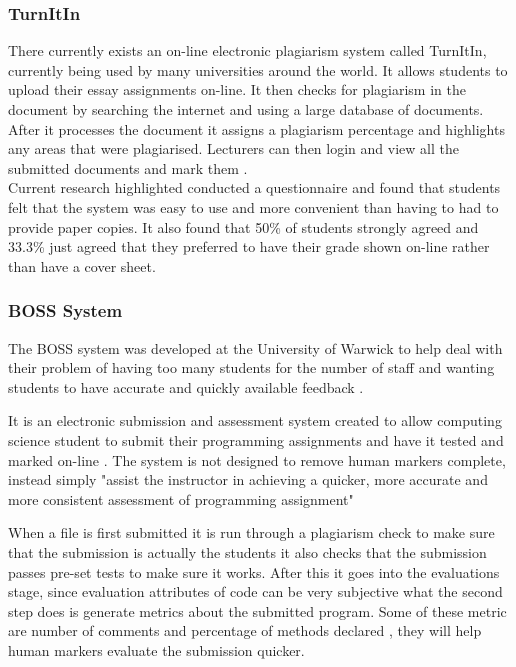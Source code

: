 \documentclass[12pt]{article}  %
\begin{document}
\subsubsection{TurnItIn}
There currently exists an on-line electronic plagiarism system called TurnItIn, \cite{_turnitin_????} currently being used by many universities around the world. It allows students to upload their essay assignments on-line. It then checks for plagiarism in the document by searching the internet and using a large database of documents. After it processes the document it assigns a plagiarism percentage and highlights any areas that were plagiarised. Lecturers can then login and view all the submitted documents and mark them .\\
Current research highlighted \cite{dahl_turnitin_2007} conducted a questionnaire and found that students felt that the system was easy to use and more convenient than having to had to provide paper copies. It also found that 50\% of students strongly agreed and 33.3\% just agreed that they preferred to have their grade shown on-line rather than have a cover sheet.

\subsubsection{BOSS System}
The BOSS system  was developed at the University of Warwick to help deal with their problem of having too many students for the number of staff and wanting students to have accurate and quickly available feedback \cite{joy_boss_2005}. 
 
It is an electronic submission and assessment system created to allow computing science student to submit their programming assignments and have it tested and marked on-line \cite{joy_effective_1998}. The system is not designed to remove human markers complete, instead simply "assist the instructor in achieving a quicker, more accurate and more consistent assessment of programming assignment"\cite{joy_boss_2005}

When a file is first submitted it is run through a plagiarism check to make sure that the submission is actually the students it also checks that the submission passes pre-set tests to make sure it works. After this it goes into the evaluations stage, since evaluation attributes of code can be very subjective what the second step does is generate metrics about the submitted program. Some of these metric are number of comments and percentage of methods declared \cite{joy_effective_1998}, they will help human markers evaluate the submission quicker.  
  
\end{document}
